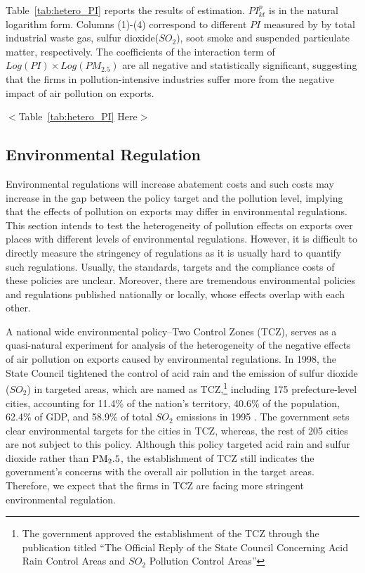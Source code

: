 \documentclass[12pt]{article}
\begin{document}
Table~\ref{tab:hetero_PI} reports the results of estimation. $PI^{p}_{kt}$ is in the natural logarithm form. Columns (1)-(4) correspond to different $PI$ measured by by total industrial waste gas, sulfur dioxide($SO_{2}$), soot smoke and suspended particulate matter, respectively. The coefficients of the interaction term of $Log(PI) \times Log(PM_{2.5})$ are all negative and statistically significant, suggesting that the firms in pollution-intensive industries suffer more from the negative impact of air pollution on exports.

\begin{center}
  $<$Table~\ref{tab:hetero_PI} Here$>$
\end{center}

 \subsection{Environmental Regulation} \label{sec:5.2.4}
Environmental regulations will increase abatement costs and such costs may increase in the gap between the policy target and the pollution level, implying that the effects of pollution on exports may differ in environmental regulations. This section intends to test the heterogeneity of pollution effects on exports over places with different levels of environmental regulations. However, it is difficult to directly measure the stringency of regulations as it is usually hard to quantify such regulations. Usually, the standards, targets and the compliance costs of these policies are unclear. Moreover, there are tremendous environmental policies and regulations published nationally or locally, whose effects overlap with each other. 

A national wide environmental policy--Two Control Zones (TCZ), serves as a quasi-natural experiment for analysis of the heterogeneity of the negative effects of air pollution on exports caused by environmental regulations.
In 1998, the State Council tightened the control of acid rain and the emission of sulfur dioxide ($SO_2$) in targeted areas, which are named as TCZ,\footnote{The government approved the establishment of the TCZ through the publication titled ``The Official
Reply of the State Council Concerning Acid Rain Control Areas and $SO_{2}$
Pollution Control Areas''} including 175 prefecture-level cities, accounting for 11.4\% of the nation's
territory, 40.6\% of the population, 62.4\% of GDP, and 58.9\% of total $%
SO_{2}$ emissions in 1995 \citep{hao2001plotting}.  
The government sets clear environmental targets for the cities in TCZ, whereas,  
the rest of 205 cities are not subject to this policy. Although this policy targeted acid rain and sulfur dioxide rather than $\rm PM_2.5$, the establishment of TCZ still indicates the government's concerns with the overall air pollution in the target areas. Therefore, we expect that the firms in TCZ are facing more stringent environmental regulation.
\end{document}
